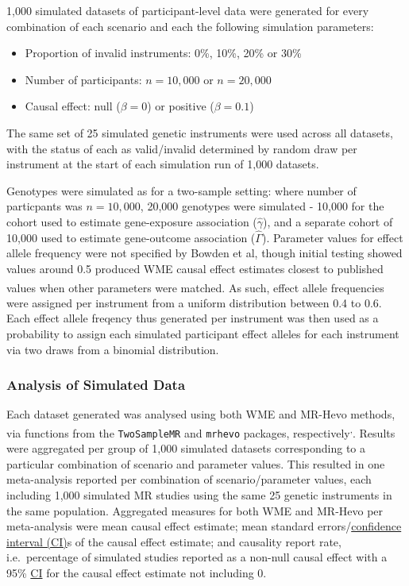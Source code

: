 \documentclass[
]{article}
\providecommand{\tightlist}{%
  \setlength{\itemsep}{0pt}\setlength{\parskip}{0pt}}
\begin{document}
1,000 simulated datasets of participant-level data were generated for every combination of each scenario and each the following simulation parameters:

\begin{itemize}
\tightlist
\item
  Proportion of invalid instruments: 0\%, 10\%, 20\% or 30\%
\item
  Number of participants: \(n = 10,000\) or \(n = 20,000\)
\item
  Causal effect: null (\(\beta = 0\)) or positive (\(\beta = 0.1\))
\end{itemize}

The same set of 25 simulated genetic instruments were used across all datasets, with the status of each as valid/invalid determined by random draw per instrument at the start of each simulation run of 1,000 datasets.

Genotypes were simulated as for a two-sample setting: where number of particpants was \(n = 10,000\), 20,000 genotypes were simulated - 10,000 for the cohort used to estimate gene-exposure association (\(\hat{\gamma}\)), and a separate cohort of 10,000 used to estimate gene-outcome association (\(\hat{\Gamma}\)). Parameter values for effect allele frequency were not specified by Bowden et al, though initial testing showed values around 0.5 produced WME causal effect estimates closest to published values when other parameters were matched\textsuperscript{}. As such, effect allele frequencies were assigned per instrument from a uniform distribution between 0.4 to 0.6. Each effect allele freqency thus generated per instrument was then used as a probability to assign each simulated participant effect alleles for each instrument via two draws from a binomial distribution.

\subsubsection{Analysis of Simulated Data}\label{analysis-of-simulated-data}

Each dataset generated was analysed using both WME and MR-Hevo methods, via functions from the \texttt{TwoSampleMR} and \texttt{mrhevo} packages, respectively\textsuperscript{,}. Results were aggregated per group of 1,000 simulated datasets corresponding to a particular combination of scenario and parameter values. This resulted in one meta-analysis reported per combination of scenario/parameter values, each including 1,000 simulated MR studies using the same 25 genetic instruments in the same population. Aggregated measures for both WME and MR-Hevo per meta-analysis were mean causal effect estimate; mean standard errors/\hyperref[acronyms_CI]{confidence interval (CI)}s of the causal effect estimate; and causality report rate, i.e.~percentage of simulated studies reported as a non-null causal effect with a 95\% \hyperref[acronyms_CI]{CI} for the causal effect estimate not including 0.
\end{document}
